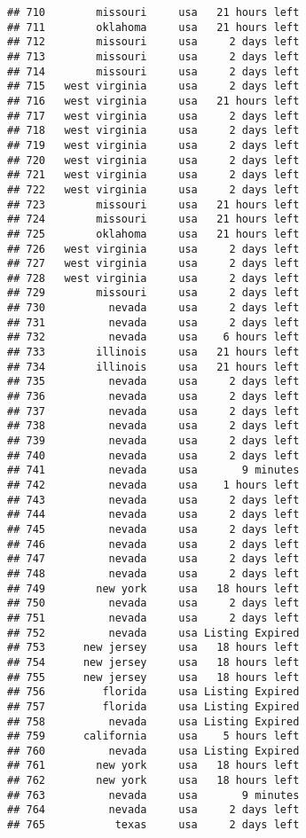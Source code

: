\documentclass[
]{article}
\begin{document}
\begin{verbatim}
## 710        missouri     usa   21 hours left
## 711        oklahoma     usa   21 hours left
## 712        missouri     usa     2 days left
## 713        missouri     usa     2 days left
## 714        missouri     usa     2 days left
## 715   west virginia     usa     2 days left
## 716   west virginia     usa   21 hours left
## 717   west virginia     usa     2 days left
## 718   west virginia     usa     2 days left
## 719   west virginia     usa     2 days left
## 720   west virginia     usa     2 days left
## 721   west virginia     usa     2 days left
## 722   west virginia     usa     2 days left
## 723        missouri     usa   21 hours left
## 724        missouri     usa   21 hours left
## 725        oklahoma     usa   21 hours left
## 726   west virginia     usa     2 days left
## 727   west virginia     usa     2 days left
## 728   west virginia     usa     2 days left
## 729        missouri     usa     2 days left
## 730          nevada     usa     2 days left
## 731          nevada     usa     2 days left
## 732          nevada     usa    6 hours left
## 733        illinois     usa   21 hours left
## 734        illinois     usa   21 hours left
## 735          nevada     usa     2 days left
## 736          nevada     usa     2 days left
## 737          nevada     usa     2 days left
## 738          nevada     usa     2 days left
## 739          nevada     usa     2 days left
## 740          nevada     usa     2 days left
## 741          nevada     usa       9 minutes
## 742          nevada     usa    1 hours left
## 743          nevada     usa     2 days left
## 744          nevada     usa     2 days left
## 745          nevada     usa     2 days left
## 746          nevada     usa     2 days left
## 747          nevada     usa     2 days left
## 748          nevada     usa     2 days left
## 749        new york     usa   18 hours left
## 750          nevada     usa     2 days left
## 751          nevada     usa     2 days left
## 752          nevada     usa Listing Expired
## 753      new jersey     usa   18 hours left
## 754      new jersey     usa   18 hours left
## 755      new jersey     usa   18 hours left
## 756         florida     usa Listing Expired
## 757         florida     usa Listing Expired
## 758          nevada     usa Listing Expired
## 759      california     usa    5 hours left
## 760          nevada     usa Listing Expired
## 761        new york     usa   18 hours left
## 762        new york     usa   18 hours left
## 763          nevada     usa       9 minutes
## 764          nevada     usa     2 days left
## 765           texas     usa     2 days left

\end{verbatim}
\end{document}
